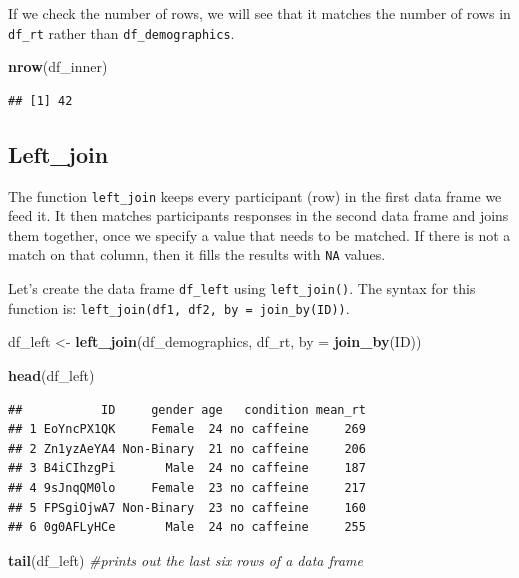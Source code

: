\documentclass[
]{book}
\newenvironment{Shaded}{\begin{snugshade}}{\end{snugshade}}
\newcommand{\AttributeTok}[1]{\textcolor[rgb]{0.13,0.29,0.53}{#1}}
\newcommand{\CommentTok}[1]{\textcolor[rgb]{0.56,0.35,0.01}{\textit{#1}}}
\newcommand{\FunctionTok}[1]{\textcolor[rgb]{0.13,0.29,0.53}{\textbf{#1}}}
\newcommand{\NormalTok}[1]{#1}
\newcommand{\OtherTok}[1]{\textcolor[rgb]{0.56,0.35,0.01}{#1}}
\begin{document}
If we check the number of rows, we will see that it matches the number of rows in \texttt{df\_rt} rather than \texttt{df\_demographics}.

\begin{Shaded}
\begin{Highlighting}[]
\FunctionTok{nrow}\NormalTok{(df\_inner)}
\end{Highlighting}
\end{Shaded}

\begin{verbatim}
## [1] 42
\end{verbatim}

\hypertarget{left_join}{%
\subsection{Left\_join}\label{left_join}}

The function \texttt{left\_join} keeps every participant (row) in the first data frame we feed it. It then matches participants responses in the second data frame and joins them together, once we specify a value that needs to be matched. If there is not a match on that column, then it fills the results with \texttt{NA} values.

Let's create the data frame \texttt{df\_left} using \texttt{left\_join()}. The syntax for this function is: \texttt{left\_join(df1,\ df2,\ by\ =\ join\_by(ID))}.

\begin{Shaded}
\begin{Highlighting}[]
\NormalTok{df\_left }\OtherTok{\textless{}{-}} \FunctionTok{left\_join}\NormalTok{(df\_demographics, df\_rt, }\AttributeTok{by =} \FunctionTok{join\_by}\NormalTok{(ID))}


\FunctionTok{head}\NormalTok{(df\_left)}
\end{Highlighting}
\end{Shaded}

\begin{verbatim}
##           ID     gender age   condition mean_rt
## 1 EoYncPX1QK     Female  24 no caffeine     269
## 2 Zn1yzAeYA4 Non-Binary  21 no caffeine     206
## 3 B4iCIhzgPi       Male  24 no caffeine     187
## 4 9sJnqQM0lo     Female  23 no caffeine     217
## 5 FPSgiOjwA7 Non-Binary  23 no caffeine     160
## 6 0g0AFLyHCe       Male  24 no caffeine     255
\end{verbatim}

\begin{Shaded}
\begin{Highlighting}[]
\FunctionTok{tail}\NormalTok{(df\_left) }\CommentTok{\#prints out the last six rows of a data frame}
\end{Highlighting}
\end{Shaded}
\end{document}
